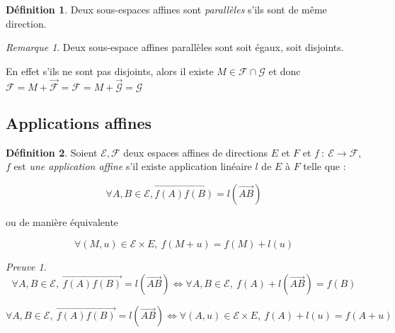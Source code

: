 \documentclass[]{article}
\theoremstyle{remark}
\newtheorem{myrem}{Remarque}
\newtheorem{myproof}{Preuve}
\theoremstyle{definition}
\newtheorem{mydef}{Définition}
\newcommand{\funcshort}[3]{
#1 ~ : ~ #2 \longrightarrow #3
}
\begin{document}
\begin{mydef}
	Deux sous-espaces affines sont \textit{parallèles} s'ils sont de même direction.
\end{mydef}

\begin{myrem}
	Deux sous-espace affines parallèles sont soit égaux, soit disjoints.
	
	En effet s'ils ne sont pas disjoints, alors il existe $M \in \mathcal{F} \cap \mathcal{G}$ et donc $\mathcal{F} = M + \overrightarrow{\mathcal{F}} = \mathcal{F} = M + \overrightarrow{\mathcal{G}} = \mathcal{G}$
\end{myrem}

\subsection{Applications affines}

\begin{mydef}
	Soient $\mathcal{E}, \mathcal{F}$ deux espaces affines de directions $E$ et $F$ et $\funcshort{f}{\mathcal{E}}{\mathcal{F}}$, $f$ est \textit{une application affine} s'il existe application linéaire $l$ de $E$ à $F$ telle que :
	
	$$\forall A, B \in \mathcal{E}, \overrightarrow{f(A) f(B)} = l(\overrightarrow{AB})$$
	
	ou de manière équivalente
	
	$$\forall (M, u) \in \mathcal{E} \times E, ~ f(M + u) = f(M) + l(u)$$
\end{mydef}

\begin{myproof}
	$$\forall A, B \in \mathcal{E}, ~ \overrightarrow{f(A)f(B)} = l(\overrightarrow{AB}) \Longleftrightarrow \forall A, B \in \mathcal{E}, ~ f(A) + l(\overrightarrow{AB}) = f(B)$$

	$$\forall A, B \in \mathcal{E}, ~ \overrightarrow{f(A)f(B)} = l(\overrightarrow{AB}) \Longleftrightarrow \forall (A, u) \in \mathcal{E} \times E, ~ f(A) + l(u) = f(A+u)$$
\end{myproof}
\end{document}
